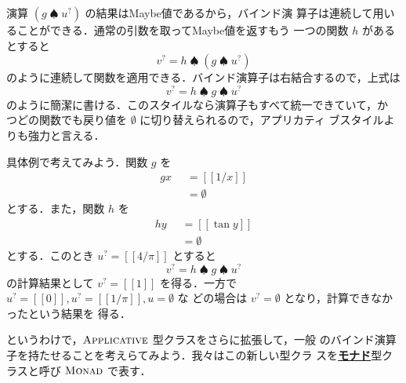 \documentclass[a5paper,twoside,fleqn,draft]{jsbook}
\def\[{[\![}
\def\]{]\!]}
\newcommand{\keyword}[1]{{\underline{\textbf{#1}}}}
\newcommand{\mKeyword}[1]{\mathsf{#1}}
\newcommand{\mOtherwiseKeyword}{\mKeyword{otherwise}}
\DeclareMathOperator{\mOtherwise}{\mOtherwiseKeyword}
\newcommand{\mNothing}{\emptyset}
\DeclareMathOperator{\mBindMaybe}{\spadesuit}
\newcommand{\mValueConstructor}[1]{\mathrm{#1}}
\newcommand{\mValueWith}[2]{{}^\mValueConstructor{#1}\[#2\]}
\newcommand{\mJustWith}[1]{\[#1\]}%
\newcommand{\mTypeClass}[1]{\textsc{#1}} %
\newcommand{\mApplicativeTypeClass}{\mTypeClass{Applicative}}
\newcommand{\mMonadTypeClass}{\mTypeClass{Monad}}
\newcommand{\mMaybe}[1]{{#1}^?}
\newcommand{\mGuard}[1]{\mathop{\mid_{#1}}}
\begin{document}
演算 $(g\mBindMaybe\mMaybe{u})$ の結果はMaybe値であるから，バインド演
算子は連続して用いることができる．通常の引数を取ってMaybe値を返すもう
一つの関数 $h$ があるとすると
\begin{equation}
  \mMaybe{v}=h\mBindMaybe{}(g\mBindMaybe\mMaybe{u})
\end{equation}
のように連続して関数を適用できる．バインド演算子は右結合するので，上式は
\begin{equation}
  \label{eq:maybe-z-bind-style}
  \mMaybe{v}=h\mBindMaybe g\mBindMaybe\mMaybe{u}
\end{equation}
のように簡潔に書ける．このスタイルなら演算子もすべて統一できていて，か
つどの関数でも戻り値を $\mNothing$ に切り替えられるので，アプリカティ
ブスタイルよりも強力と言える．

具体例で考えてみよう．関数 $g$ を
\begin{equation}
  \begin{aligned}
    gx&\mGuard{x\neq0}=\mJustWith{1/x}\\
    &\mGuard{\mOtherwise}=\mNothing
  \end{aligned}
\end{equation}
とする．また，関数 $h$ を
\begin{equation}
  \begin{aligned}
    hy&\mGuard{-\frac{\pi}{2}<y<\frac{\pi}{2}}=\mJustWith{\tan y}\\
    &\mGuard{\mOtherwise}=\mNothing
  \end{aligned}
\end{equation}
とする．このとき $\mMaybe{u}=\mJustWith{4/\pi}$ とすると
\begin{equation}
\mMaybe{v}=h\mBindMaybe g\mBindMaybe\mMaybe{u}
\end{equation}
の計算結果として $\mMaybe{v}=\mJustWith{1}$ を得る．一方で
$\mMaybe{u}=\mJustWith{0},\mMaybe{u}=\mJustWith{1/\pi},u=\mNothing$ な
どの場合は $\mMaybe{v}=\mNothing$ となり，計算できなかったという結果を
得る．


というわけで，$\mApplicativeTypeClass$ 型クラスをさらに拡張して，一般
のバインド演算子を持たせることを考えらてみよう．我々はこの新しい型クラ
スを\keyword{モナド}型クラスと呼び $\mMonadTypeClass$ で表す．
\end{document}
